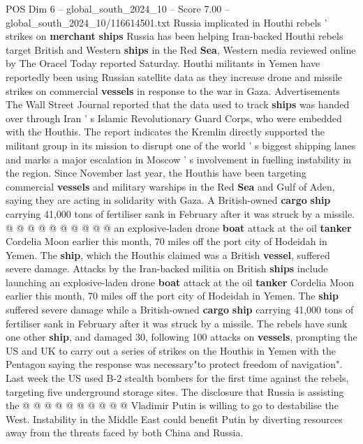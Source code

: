 \begin{textsample}{POS Dim 6 – global\_south\_2024\_10 – Score 7.00 – global\_south\_2024\_10/116614501.txt}  \label{ex:f6_pos_402}
Russia implicated in Houthi rebels ' strikes on \textbf{merchant} \textbf{ships} Russia has been helping Iran-backed Houthi rebels target British and Western \textbf{ships} in the Red \textbf{Sea}, Western media reviewed online by The Oracel Today reported Saturday.
Houthi militants in Yemen have reportedly been using Russian satellite data as they increase drone and missile strikes on commercial \textbf{vessels} in response to the war in Gaza.
Advertisements The Wall Street Journal reported that the data used to track \textbf{ships} was handed over through Iran ' s Islamic Revolutionary Guard Corps, who were embedded with the Houthis.
The report indicates the Kremlin directly supported the militant group in its mission to disrupt one of the world ' s biggest shipping lanes and marks a major escalation in Moscow ' s involvement in fuelling instability in the region.
Since November last year, the Houthis have been targeting commercial \textbf{vessels} and military warships in the Red \textbf{Sea} and Gulf of Aden, saying they are acting in solidarity with Gaza.
A British-owned \textbf{cargo} \textbf{ship} carrying 41,000 tons of fertiliser sank in February after it was struck by a missile. @ @ @ @ @ @ @ @ @ @ an explosive-laden drone \textbf{boat} attack at the oil \textbf{tanker} Cordelia Moon earlier this month, 70 miles off the port city of Hodeidah in Yemen.
The \textbf{ship}, which the Houthis claimed was a British \textbf{vessel}, suffered severe damage.
Attacks by the Iran-backed militia on British \textbf{ships} include launching an explosive-laden drone \textbf{boat} attack at the oil \textbf{tanker} Cordelia Moon earlier this month, 70 miles off the port city of Hodeidah in Yemen.
The \textbf{ship} suffered severe damage while a British-owned \textbf{cargo} \textbf{ship} carrying 41,000 tons of fertiliser sank in February after it was struck by a missile.
The rebels have sunk one other \textbf{ship}, and damaged 30, following 100 attacks on \textbf{vessels}, prompting the US and UK to carry out a series of strikes on the Houthis in Yemen with the Pentagon saying the response was necessary"to protect freedom of navigation".
Last week the US used B-2 stealth bombers for the first time against the rebels, targeting five underground storage sites.
The disclosure that Russia is assisting the @ @ @ @ @ @ @ @ @ @ Vladimir Putin is willing to go to destabilise the West.
Instability in the Middle East could benefit Putin by diverting resources away from the threats faced by both China and Russia.

\end{textsample}
